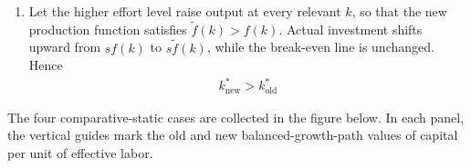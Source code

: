 \begin{solution}
\begin{enumerate}[label=(\alph*)]
    Solving the steady-state condition \eqref{eq:p13-steady-state} for the
    Cobb--Douglas case gives
    \begin{align*}
        k^*=\left(\frac{s}{n+g+\delta}\right)^{1/(1-\alpha)}.
        \problemeqtag
    \end{align*}
    Taking logs and differentiating with respect to \(\alpha\) gives
    \begin{align*}
        \frac{\partial\ln k^*}{\partial\alpha}
        =\frac{\ln\!\left(s/(n+g+\delta)\right)}{(1-\alpha)^2}.
        \problemeqtag
    \end{align*}
    Consequently,
    \begin{align*}
        \boxed{
        \begin{array}{lll}
            s>n+g+\delta &\Longrightarrow& k^*\text{ rises},\\
            s<n+g+\delta &\Longrightarrow& k^*\text{ falls},\\
            s=n+g+\delta &\Longrightarrow& k^*=1\text{ and is unchanged}.
        \end{array}}
    \end{align*}
    Without additional information, the effect on \(k^*\) is ambiguous.

    \item Let the higher effort level raise output at every relevant \(k\), so that the
    new production function satisfies \(\widetilde f(k)>f(k)\). Actual investment shifts
    upward from \(sf(k)\) to \(s\widetilde f(k)\), while the break-even line is unchanged.
    Hence
    \begin{align*}
        \boxed{k^*_{\mathrm{new}}>k^*_{\mathrm{old}}}
    \end{align*}
\end{enumerate}

The four comparative-static cases are collected in the figure below. In each
panel, the vertical guides mark the old and new balanced-growth-path values of
capital per unit of effective labor.


\end{solution}
